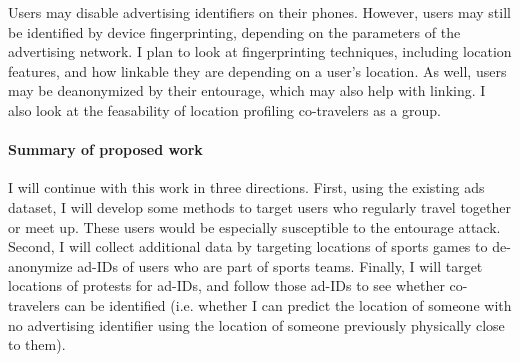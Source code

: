 Users may disable advertising identifiers on their phones. However, users may still be identified by device fingerprinting, depending on the parameters of the advertising network. I plan to look at fingerprinting techniques, including location features, and how linkable they are depending on a user's location. As well, users may be deanonymized by their entourage, which may also help with linking. I also look at the feasability of location profiling co-travelers as a group.

\paragraph*{Summary of proposed work}

I will continue with this work in three directions. First, using the existing ads dataset, I will develop some methods to target users who regularly travel together or meet up. These users would be especially susceptible to the entourage attack. Second, I will collect additional data by targeting locations of sports games to de-anonymize ad-IDs of users who are part of sports teams. Finally, I will target locations of protests for ad-IDs, and follow those ad-IDs to see whether co-travelers can be identified (i.e. whether I can predict the location of someone with no advertising identifier using the location of someone previously physically close to them).



